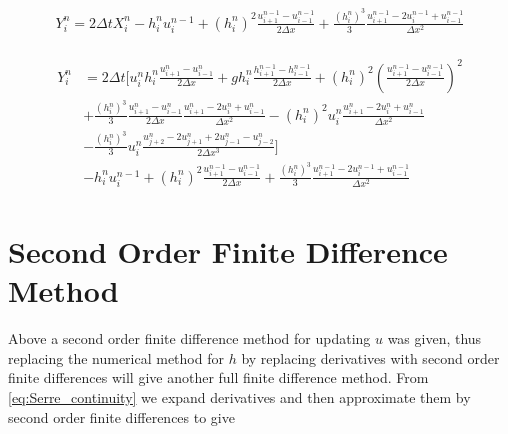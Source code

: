 \documentclass[SingleSpace,12pt,Proceedings]{Serre_ASCE}
\begin{document}
\begin{linenomath*}
\begin{gather}
\begin{split}
Y^n_i = 2\Delta tX_i^{n} - h_i^{n}u_i^{n-1} + \left(h_i^{n}\right)^2\frac{u^{n-1}_{i+1} - u^{n-1}_{i-1}}{2\Delta x} + \frac{\left(h_i^{n}\right)^3}{3}\frac{u^{n-1}_{i+1} -2 u^{n-1}_{i} + u^{n-1}_{i-1}}{\Delta x^2}
\end{split}
\end{gather}
\end{linenomath*}

\begin{linenomath*}
\begin{gather}
\begin{split}
Y^n_i &= 2\Delta t \Bigg[u^n_ih^n_i \frac{u^{n}_{i+1} - u^{n}_{i-1}}{2\Delta x} + gh^n_i\frac{h^{n-1}_{i+1} - h^{n-1}_{i-1}}{2\Delta x} + \left(h^n_i\right)^2 \left(\frac{u^{n-1}_{i+1} - u^{n-1}_{i-1}}{2\Delta x} \right)^2 \\ &+ \frac{\left(h^n_i\right)^3}{3}\frac{u^{n}_{i+1} - u^{n}_{i-1}}{2\Delta x}\frac{u^{n}_{i+1} -2u^{n}_{i}   + u^{n}_{i-1}}{\Delta x^2} - \left(h^n_i\right)^2u^n_i\frac{u^{n}_{i+1} -2u^{n}_{i} + u^{n}_{i-1}}{\Delta x^2}  \\  &- \frac{\left(h^n_i\right)^3}{3}u^n_i\frac{ u^n_{j+2} - 2u^n_{j+1} + 2 u^n_{j-1} - u^n_{j-2}}{2 \Delta x^3} \Bigg] \\ &- h_i^{n}u_i^{n-1} + \left(h_i^{n}\right)^2\frac{u^{n-1}_{i+1} - u^{n-1}_{i-1}}{2\Delta x} + \frac{\left(h_i^{n}\right)^3}{3}\frac{u^{n-1}_{i+1} -2 u^{n-1}_{i} + u^{n-1}_{i-1}}{\Delta x^2}
\end{split}
\end{gather}
\end{linenomath*}

\section{Second Order Finite Difference Method}
Above a second order finite difference method for updating $u$ was given, thus replacing the numerical method for $h$ by replacing derivatives with second order finite differences will give another full finite difference method. From \eqref{eq:Serre_continuity} we expand derivatives and then approximate them by second order finite differences to give
\end{document}
